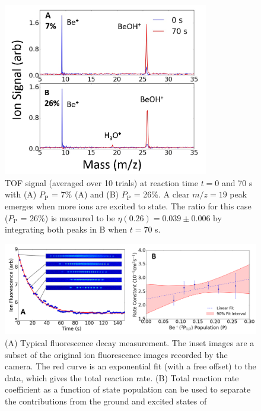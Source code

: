 \begin{figure}
	\centering
	\includegraphics[width=0.8\textwidth]{images/Be_H2O_TOF.png}
	\caption{TOF signal (averaged over 10 trials) at reaction time $t = 0$ and 70 s with (A) $P_{\text{P}}$ = 7\% (A) and (B) $P_{\text{P}}$ = 26\%. A clear $m/z = 19$ peak emerges when more  ions are excited to  state. The  ratio for this case ($P_{\text{P}}$ = 26\%) is measured to be $\eta(0.26) = 0.039 \pm 0.006$ by integrating both peaks in B when $t = 70$ s.}
	\label{fig: Be+H2O TOF}
\end{figure}

\begin{figure}
	\centering
	\includegraphics[width=\textwidth]{images/Be_H2O_fit.png}
	\caption{(A) Typical fluorescence decay measurement. The inset images are a subset of the original ion fluorescence images recorded by the camera. The red curve is an exponential fit (with a free offset) to the data, which gives the total reaction rate. (B) Total reaction rate coefficient as a function of  state population can be used to separate the contributions from the ground and excited states of }
	\label{fig: Be+H2O fit}
\end{figure}

